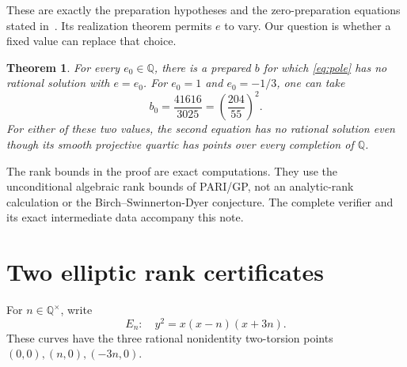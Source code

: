 \documentclass[11pt,a4paper]{article}
\newtheorem{theorem}{Theorem}[section]
\theoremstyle{definition}\newtheorem{definition}[theorem]{Definition}
\newcommand{\Q}{\mathbb Q}\newcommand{\Z}{\mathbb Z}
\begin{document}
These are exactly the preparation hypotheses and the zero-preparation
equations stated in~\cite[Section~3]{Dependencies}.  Its realization
theorem permits $e$ to vary.  Our question is whether a fixed value
can replace that choice.

\begin{theorem}\label{thm:fixed-e}
For every $e_0\in\Q$, there is a prepared $b$ for which
\eqref{eq:pole} has no rational solution with $e=e_0$.
For $e_0=1$ and $e_0=-1/3$, one can take
\[
                          b_0=\frac{41616}{3025}=\left(\frac{204}{55}\right)^2.
\]
For either of these two values, the second equation has no rational
solution even though its smooth projective quartic has points over
every completion of $\Q$.
\end{theorem}

The rank bounds in the proof are exact computations.  They use the
unconditional algebraic rank bounds of PARI/GP, not an analytic-rank
calculation or the Birch--Swinnerton-Dyer conjecture.  The complete
verifier and its exact intermediate data accompany this note.

\section{Two elliptic rank certificates}

For $n\in\Q^\times$, write
\[
                 E_n:\quad y^2=x(x-n)(x+3n).
\]
These curves have the three rational nonidentity two-torsion points
$(0,0),(n,0),(-3n,0)$.
\end{document}
